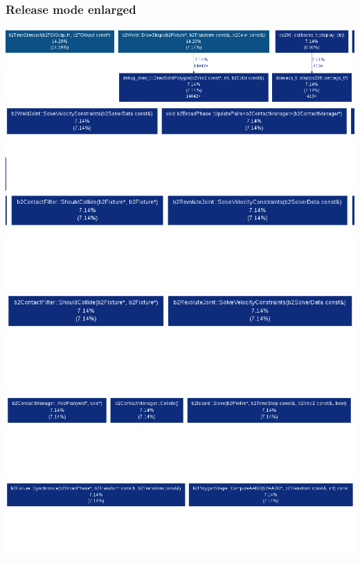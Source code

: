 \documentclass[11pt]{article}
\begin{document}
\subsubsection*{Release mode enlarged}
\includegraphics[scale=0.30]{./images/rcall1.png}
\includegraphics[scale=0.30]{./images/rcall2.png}
\includegraphics[scale=0.30]{./images/rcall3.png}
\includegraphics[scale=0.30]{./images/rcall4.png}
\includegraphics[scale=0.30]{./images/rcall5.png}
\includegraphics[scale=0.30]{./images/rcall6.png}
\end{document}
